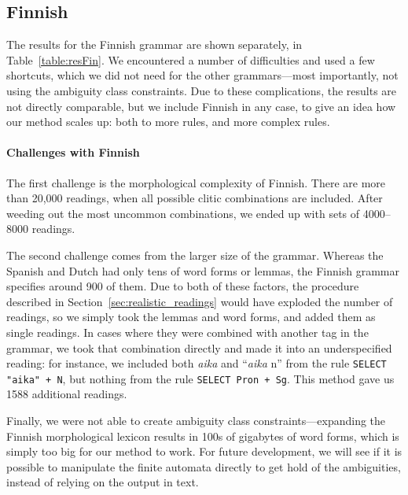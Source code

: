 {{\subsection{Finnish} 
\label{sec:finnishEval}

The results for the Finnish grammar are shown separately, in
Table~\ref{table:resFin}. We encountered a number of difficulties and
used a few shortcuts, which we did not need for the other
grammars---most importantly, not using the ambiguity class
constraints. Due to these complications, the results are not directly
comparable, but we include Finnish in any case, to give an idea how
our method scales up: both to more rules, and more complex rules.

\paragraph{Challenges with Finnish} The first challenge is the
morphological complexity of Finnish.  There are more than 20,000
readings, when all possible clitic combinations are included.  After
weeding out the most uncommon combinations, we ended up with sets of
4000--8000 readings.

The second challenge comes from the larger size of the
grammar. Whereas the Spanish and Dutch had only tens of word forms or
lemmas, the Finnish grammar specifies around 900 of them.  Due to both
of these factors, the procedure described in
Section~\ref{sec:realistic_readings} would have exploded the number of
readings, so we simply took the lemmas and word forms, and added them
as single readings.  In cases where they were combined with another
tag in the grammar, we took that combination directly and made it into
an underspecified reading: for instance, we included both \emph{aika}
and ``\emph{aika} n'' from the rule \texttt{SELECT "aika" + N}, but
nothing from the rule \texttt{SELECT Pron + Sg}. This method gave us
1588 additional readings.

Finally, we were not able to create ambiguity class
constraints---expanding the Finnish morphological lexicon results in
100s of gigabytes of word forms, which is simply too big for our
method to work.  For future development, we will see if it is possible
to manipulate the finite automata directly to get hold of the
ambiguities, instead of relying on the output in text.


\def\oneClLG{{\sc 1~cl~+~lem}}
\def\twoClLG{{\sc 2~cl~+~lem}}
\def\oneClRG{{\sc 1~cl~+~rds}}
\def\allRG{{\sc only~rds}}

}}
